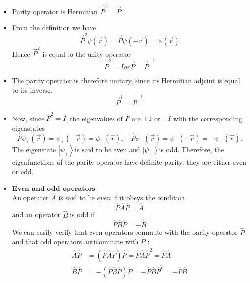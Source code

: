  \begin{note}
 	\begin{itemize}
 		\item Parity operator is Hermitian $\vec{P}^{\dagger}=\vec{P}$
 		\item From the definition we have\\
 		$$\vec{P}^2 \psi(\vec{r})=\vec{P}\psi(-\vec{r})=\psi(\vec{r})$$
 		Hence $\vec{P}^2$ is equal to the unity operator
 		$$\vec{P}^2=I or \vec{P}=\vec{P}^{-1}$$
 		\item The parity operator is therefore unitary, since its Hermitian adjoint is equal to its inverse.\\
 		$$\vec{P}^{\dagger}=\vec{P}^{-1}$$ 
 		\item Now, since $\hat{P}^{2}=\hat{I}$, the eigenvalues of $\hat{P}$ are $+1$ or $-I$ with the corresponding eigenstates
 		$$
 		\hat{P} \psi_{+}(\vec{r})=\psi_{+}(-\vec{r})=\psi_{+}(\vec{r}), \quad \hat{P} \psi_{-}(\vec{r})=\psi_{-}(-\vec{r})=-\psi_{-}(\vec{r}) .
 		$$
 		The eigenstate $\left|\psi_{+}\right\rangle$is said to be even and $\left|\psi_{-}\right\rangle$is odd. Therefore, the eigenfunctions of the parity operator have definite parity: they are either even or odd.
 		\item \textbf{Even and odd operators}\\
 		An operator $\hat{A}$ is said to be $e v e n$ if it obeys the condition
 		$$
 		\hat{P} \hat{A} \hat{P}=\hat{A}
 		$$
 		and an operator $\hat{B}$ is odd if
 		$$
 		\hat{P} \hat{B} \hat{P}=-\hat{B}
 		$$
 		We can easily verify that even operators commute with the parity operator $\hat{P}$ and that odd operators anticommute with $\hat{P}$ :
 		$$
 		\begin{aligned}
 		\hat{A} \hat{P} &=(\hat{P} \hat{A} \hat{P}) \hat{P}=\hat{P} \hat{A} \hat{P}^{2}=\hat{P}\hat{A} \\
 		\hat{B} \hat{P} &=-(\hat{P} \hat{B} \hat{P}) \hat{P}=-\hat{P} \hat{B} \hat{P}^{2}=-\hat{P} \hat{B}
 		\end{aligned}
 		$$
 	\end{itemize}
 \end{note}

